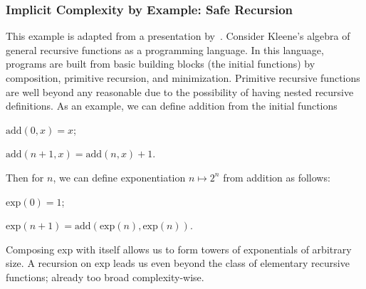 \subsubsection{Implicit Complexity by Example: Safe Recursion}
\label{safe-rec}

This example is adapted from a presentation by~\textcite{dallago2022}.
Consider Kleene's algebra of general recursive functions as a programming language.
In this language, programs are built from basic building blocks (the initial functions) by %
composition, primitive recursion, and minimization.
Primitive recursive functions are
well beyond any reasonable 
due to the possibility of having nested recursive definitions.
As an example, we can define addition from the initial functions

\begin{center}
\(\text{add}(0, x) = x\);

\(\text{add}(n + 1, x) = \text{add}(n, x) + 1\).
\end{center}

Then for \(n\), we can define exponentiation \(n \mapsto 2^n\) from addition as follows:

\begin{center}
\(\text{exp}(0) = 1\);

\(\text{exp}(n + 1) = \text{add}(\text{exp}(n), \text{exp}(n))\).
\end{center}

\noindent Composing exp with itself allows us to form towers of exponentials of arbitrary size. %
A recursion on exp leads us even beyond the class of elementary recursive functions; %
already too broad complexity-wise.

